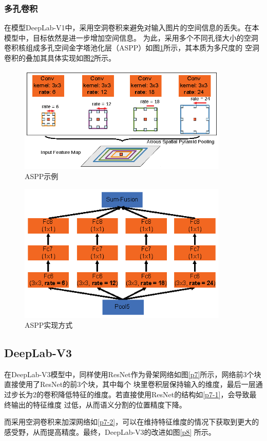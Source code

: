\documentclass[10pt, a4paper]{article}
\begin{document}
\subsubsection{多孔卷积}
在模型DeepLab-V1中，采用空洞卷积来避免对输入图片的空间信息的丢失。在本模型中，目标依然是进一步增加空间信息。
为此，采用多个不同孔径大小的空洞卷积核组成多孔空间金字塔池化层（ASPP）如图\ref{p5}所示，其本质为多尺度的
空洞卷积的叠加其具体实现如图\ref{p6}所示。
\begin{figure}[h]
    \centering
    \includegraphics[width=10cm]{p5.eps}
    \caption{ASPP示例}
    \label{p5}
\end{figure}

\begin{figure}[h]
    \centering
    \includegraphics[width=10cm]{p6.eps}
    \caption{ASPP实现方式}
    \label{p6}
\end{figure}

\subsection{DeepLab-V3}
在DeepLab-V3模型中，同样使用ResNet作为骨架网络如图\ref{p7}所示，网络前3个块直接使用了ResNet的前3个块，其中每个
块里卷积层保持输入的维度，最后一层通过步长为2的卷积降低特征的维度。若直接使用ResNet的结构如\ref{p7-1}，会导致最终输出的特征维度
过低，从而语义分割的位置精度下降。

而采用空洞卷积来加深网络如\ref{p7-2}，可以在维持特征维度的情况下获取到更大的感受野，从而提高精度。最终，DeepLab-V3的改进如图\ref{p8}
所示。
\end{document}

